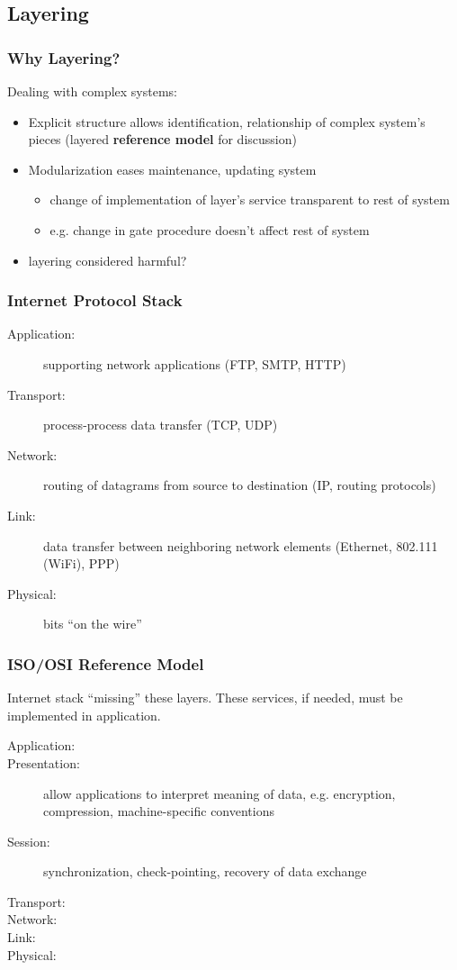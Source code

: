 \documentclass[12pt, a4paper]{article}
\begin{document}
\begin{multicols*}{2}
\subsection{Layering}
\subsubsection{Why Layering?}
Dealing with complex systems:
\begin{itemize}
	\item Explicit structure allows identification, relationship of complex system's pieces (layered \textbf{reference model} for discussion)
	\item Modularization eases maintenance, updating system
	\begin{itemize}
		\item change of implementation of layer's service transparent to rest of system
		\item e.g. change in gate procedure doesn't affect rest of system
	\end{itemize}
	\item layering considered harmful?
\end{itemize}
\subsubsection{Internet Protocol Stack}
\begin{description}
	\item[Application:] supporting network applications (FTP, SMTP, HTTP)
	\item[Transport:] process-process data transfer (TCP, UDP)
	\item[Network:] routing of datagrams from source to destination (IP, routing protocols)
	\item[Link:] data transfer between neighboring network elements (Ethernet, 802.111 (WiFi), PPP)
	\item[Physical:] bits ``on the wire''
\end{description}
\subsubsection{ISO/OSI Reference Model}
Internet stack ``missing'' these layers. These services, if needed, must be implemented in application.
\begin{description}
	\item[Application:]
	\item[Presentation:] allow applications to interpret meaning of data, e.g. encryption, compression, machine-specific conventions
	\item[Session:] synchronization, check-pointing, recovery of data exchange
	\item[Transport:]
	\item[Network:]
	\item[Link:]
	\item[Physical:]
\end{description}


\end{multicols*}
\end{document}
